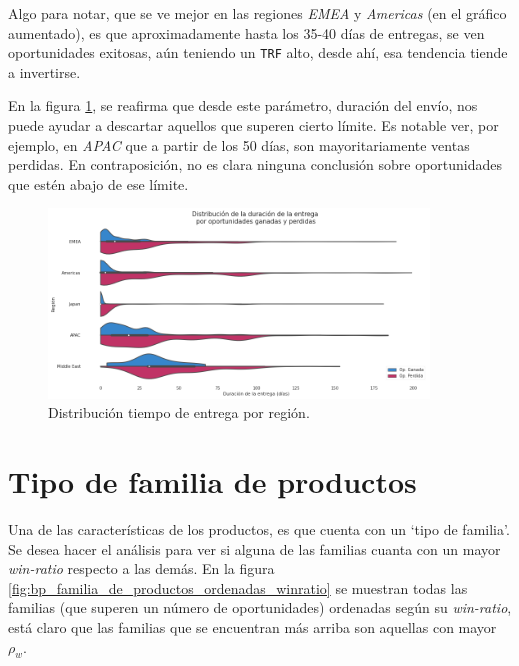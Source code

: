 \documentclass[titlepage,a4paper]{article}
\begin{document}
Algo para notar, que se ve mejor en las regiones \textit{EMEA} y \textit{Americas} (en el gráfico aumentado), es que aproximadamente hasta los 35-40 días de entregas, se ven oportunidades exitosas, aún teniendo un \verb|TRF| alto, desde ahí, esa tendencia tiende a invertirse.

En la figura \ref{fig:vi_distribucion_duracion_dias}, se reafirma que desde este parámetro, duración del envío, nos puede ayudar a descartar aquellos que superen cierto límite. Es notable ver, por ejemplo, en \textit{APAC} que a partir de los 50 días, son mayoritariamente ventas perdidas. En contraposición, no es clara ninguna conclusión sobre oportunidades que estén abajo de ese límite.

\begin{figure}[H]
\centering
\includegraphics[width=0.9\textwidth]{images/vi_distribucion_duracion_dias.png}
\cprotect\caption{\label{fig:vi_distribucion_duracion_dias} Distribución tiempo de entrega por región. }
\end{figure}

\section{Tipo de familia de productos}
Una de las características de los productos, es que cuenta con un `tipo de familia'. Se desea hacer el análisis para ver si alguna de las familias cuanta con un mayor \textit{win-ratio}  respecto a las demás. En la figura \ref{fig:bp_familia_de_productos_ordenadas_winratio} se muestran todas las familias (que superen un número de oportunidades) ordenadas según su \textit{win-ratio}, está claro que las familias que se encuentran más arriba son aquellas con mayor $\rho_w$.
\end{document}
